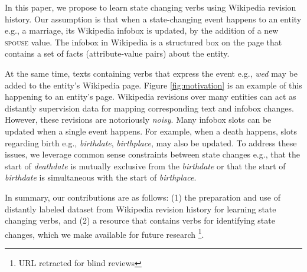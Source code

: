   

In this paper, we propose to learn state changing verbs using Wikipedia revision history. Our assumption is that when a state-changing event happens to an entity e.g., a marriage, its Wikipedia infobox is updated, by the addition of a new \textsc{spouse} value. The infobox in Wikipedia is  a structured box on the page that contains a set of facts (attribute-value pairs) about the entity. 

At the same time, texts containing verbs that express the event e.g., \textit{wed} may be added to the entity's Wikipedia page.  Figure \ref{fig:motivation} is an example of this happening to an entity's page. Wikipedia revisions over many entities can act as distantly supervision  data for mapping corresponding text and infobox changes. However, these revisions are notoriously  \textit{noisy}.  Many infobox slots can be  updated when a single event happens.
For example, when a death happens, slots regarding birth e.g., \textit{birthdate}, \textit{birthplace}, may also be updated. To address these issues, we leverage common sense constraints between state changes e.g., that the start of \textit{deathdate} is mutually exclusive from the \textit{birthdate} or that the start of \textit{birthdate} is simultaneous with the start of \textit{birthplace}.

In summary, our contributions are as follows: (1) the preparation and use of  distantly labeled dataset from Wikipedia revision history for learning state changing verbs, and (2) a resource that contains verbs for identifying state changes, which we make available for future research \footnote{URL retracted for blind reviews}.

